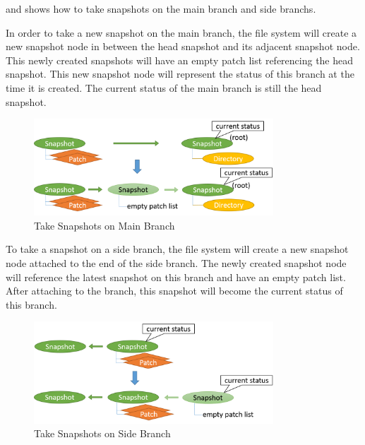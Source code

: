      and  shows how to take snapshots on the main branch and side branchs.

    In order to take a new snapshot on the main branch, the file system will create a new snapshot node in between the head snapshot and its adjacent snapshot node. This newly created snapshots will have an empty patch list referencing the head snapshot. This new snapshot node will represent the status of this branch at the time it is created. The current status of the main branch is still the head snapshot.

\begin{figure}[hbtp]
\centering
\includegraphics[width=0.8\textwidth]{Chapter-4/figs/fig20.png}
\caption{Take Snapshots on Main Branch}
\label{fig:take_snapshot_root}
\end{figure}
    
	To take a snapshot on a side branch, the file system will create a new snapshot node attached to the end of the side branch. The newly created snapshot node will reference the latest snapshot on this branch and have an empty patch list. After attaching to the branch, this snapshot will become the current status of this branch.

\begin{figure}[hbtp]
\centering
\includegraphics[width=0.8\textwidth]{Chapter-4/figs/fig21.png}
\caption{Take Snapshots on Side Branch}
\label{fig:take_snapshot_nonroot}
\end{figure}
    
